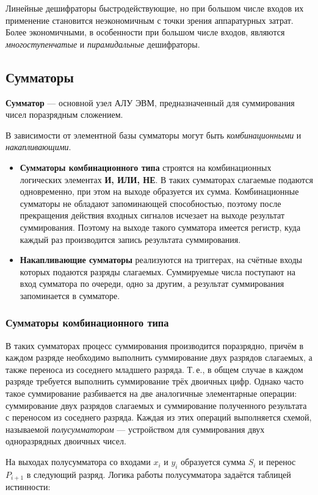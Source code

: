 \documentclass[10pt,a4paper,titlepage]{article}
\begin{document}
Линейные дешифраторы быстродействующие, но при большом числе входов их применение становится неэкономичным с точки зрения аппаратурных затрат.
Более экономичными, в особенности при большом числе входов, являются \textit{многоступенчатые} и \textit{пирамидальные} дешифраторы.
\subsection{Сумматоры}
\textbf{Сумматор} --- основной узел АЛУ ЭВМ, предназначенный для суммирования чисел поразрядным сложением.

В зависимости от элементной базы сумматоры могут быть \textit{комбинационными} и \textit{накапливающими}.
\begin{itemize}
\item \textbf{Сумматоры комбинационного типа} строятся на комбинационных логических элементах \textbf{И, ИЛИ, НЕ}.
В таких сумматорах слагаемые подаются одновременно, при этом на выходе образуется их сумма.
Комбинационные сумматоры не обладают запоминающей способностью, поэтому после прекращения действия входных сигналов исчезает на выходе результат суммирования.
Поэтому на выходе такого сумматора имеется  регистр, куда каждый раз производится запись результата суммирования.
\item \textbf{Накапливающие сумматоры} реализуются на триггерах, на счётные входы которых подаются разряды слагаемых.
Суммируемые числа поступают на вход сумматора по очереди, одно за другим, а результат суммирования запоминается в сумматоре.
\end{itemize}
\subsubsection{Сумматоры комбинационного типа}
В таких сумматорах процесс суммирования производится поразрядно, причём в каждом разряде необходимо выполнить суммирование двух разрядов слагаемых, а также переноса из соседнего младшего разряда.
Т.\,е., в общем случае в каждом разряде требуется выполнить суммирование трёх двоичных цифр.
Однако часто такое суммирование разбивается на две аналогичные элементарные операции: суммирование двух разрядов слагаемых и суммирование полученного результата с переносом из соседнего разряда.
Каждая из этих операций выполняется схемой, называемой \textit{полусумматором} --- устройством для суммирования двух одноразрядных двоичных чисел.

На выходах полусумматора со входами $x_i$ и $y_i$ образуется сумма $S_i$ и перенос $P_{i+1}$ в следующий разряд.
Логика работы полусумматора задаётся таблицей истинности:
\end{document}
